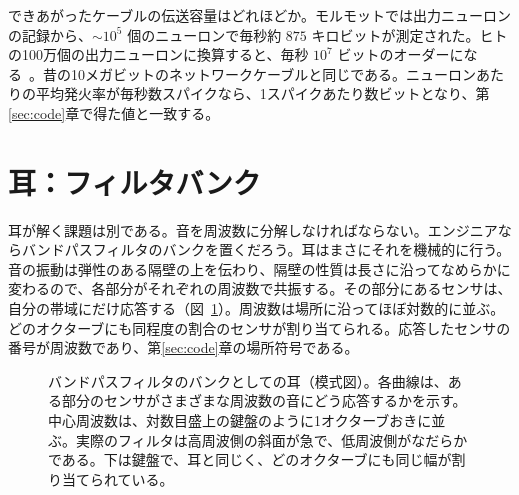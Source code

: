 できあがったケーブルの伝送容量はどれほどか。モルモットでは出力ニューロンの記録から、$\sim10^5$ 個のニューロンで毎秒約 $875$ キロビットが測定された。ヒトの100万個の出力ニューロンに換算すると、毎秒 $10^7$ ビットのオーダーになる~\cite{Koch2006}。昔の10メガビットのネットワークケーブルと同じである。ニューロンあたりの平均発火率が毎秒数スパイクなら、1スパイクあたり数ビットとなり、第\ref{sec:code}章で得た値と一致する。

\section{耳：フィルタバンク}

耳が解く課題は別である。音を周波数に分解しなければならない。エンジニアならバンドパスフィルタのバンクを置くだろう。耳はまさにそれを機械的に行う。音の振動は弾性のある隔壁の上を伝わり、隔壁の性質は長さに沿ってなめらかに変わるので、各部分がそれぞれの周波数で共振する。その部分にあるセンサは、自分の帯域にだけ応答する（図~\ref{fig:filterbank}）。周波数は場所に沿ってほぼ対数的に並ぶ。どのオクターブにも同程度の割合のセンサが割り当てられる。応答したセンサの番号が周波数であり、第\ref{sec:code}章の場所符号である。

\begin{figure}[t]
\centering
{}
\caption{バンドパスフィルタのバンクとしての耳（模式図）。各曲線は、ある部分のセンサがさまざまな周波数の音にどう応答するかを示す。中心周波数は、対数目盛上の鍵盤のように1オクターブおきに並ぶ。実際のフィルタは高周波側の斜面が急で、低周波側がなだらかである。下は鍵盤で、耳と同じく、どのオクターブにも同じ幅が割り当てられている。}
\label{fig:filterbank}
\end{figure}

